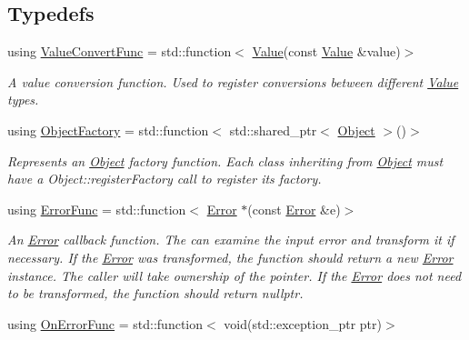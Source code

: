 \subsection*{Typedefs}
\begin{DoxyCompactItemize}
\item 
using \hyperlink{group___process_type_ga213a2a633d6658f67842bd2958c82c78}{Value\+Convert\+Func} = std\+::function$<$ \hyperlink{classdg_1_1deepcore_1_1_value}{Value}(const \hyperlink{classdg_1_1deepcore_1_1_value}{Value} \&value)$>$
\begin{DoxyCompactList}\small\item\em A value conversion function. Used to register conversions between different \hyperlink{classdg_1_1deepcore_1_1_value}{Value} types. \end{DoxyCompactList}\item 
using \hyperlink{group___process_type_ga31f9e496107d11d745b3b405d38f0e64}{Object\+Factory} = std\+::function$<$ std\+::shared\+\_\+ptr$<$ \hyperlink{classdg_1_1deepcore_1_1_object}{Object} $>$()$>$
\begin{DoxyCompactList}\small\item\em Represents an \hyperlink{classdg_1_1deepcore_1_1_object}{Object} factory function. Each class inheriting from \hyperlink{classdg_1_1deepcore_1_1_object}{Object} must have a Object\+::register\+Factory call to register its factory. \end{DoxyCompactList}\item 
using \hyperlink{group___utility_module_gaa93ea71a4ed4c044369d3b323aec4435}{Error\+Func} = std\+::function$<$ \hyperlink{classdg_1_1deepcore_1_1_error}{Error} $\ast$(const \hyperlink{classdg_1_1deepcore_1_1_error}{Error} \&e)$>$
\begin{DoxyCompactList}\small\item\em An \hyperlink{classdg_1_1deepcore_1_1_error}{Error} callback function. The can examine the input error and transform it if necessary. If the \hyperlink{classdg_1_1deepcore_1_1_error}{Error} was transformed, the function should return a new \hyperlink{classdg_1_1deepcore_1_1_error}{Error} instance. The caller will take ownership of the pointer. If the \hyperlink{classdg_1_1deepcore_1_1_error}{Error} does not need to be transformed, the function should return nullptr. \end{DoxyCompactList}\item 
using \hyperlink{group___utility_module_ga21a199c126b87ba8bfe8ad7952dbaf3b}{On\+Error\+Func} = std\+::function$<$ void(std\+::exception\+\_\+ptr ptr)$>$

\end{DoxyCompactItemize}

